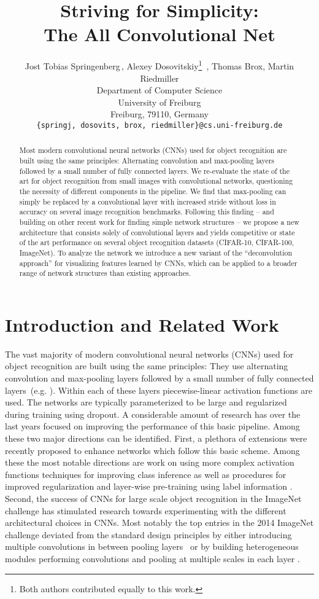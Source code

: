 \documentclass{article} \usepackage{iclr2015,times}
\title{Striving for Simplicity: \\ The All Convolutional Net}
\author{
Jost Tobias Springenberg\footnotemark[1] \,, Alexey
Dosovitskiy\thanks{Both authors contributed equally to this work.}\, , Thomas Brox, Martin Riedmiller \\
Department of Computer Science\\
University of Freiburg\\
Freiburg, 79110, Germany \\
\texttt{\{springj, dosovits, brox, riedmiller\}@cs.uni-freiburg.de} \\
}
\begin{document}
\maketitle

\begin{abstract}
Most modern convolutional neural networks (CNNs) used for
object recognition are built using the same principles: Alternating convolution and max-pooling
layers followed by a small number of fully connected layers.
We re-evaluate the state of the art for object recognition from small
images with convolutional networks, questioning the necessity of
different components in the pipeline. We find that
max-pooling can simply be replaced by a convolutional layer with increased stride
without loss in accuracy on several image recognition
benchmarks. Following this finding -- and building on other recent work
for finding simple network structures -- we propose a new
architecture that consists solely of convolutional layers and yields
competitive or state of the art performance on several object recognition datasets (CIFAR-10, CIFAR-100, ImageNet). 
To analyze the network we introduce a new variant of the ``deconvolution approach'' for visualizing features learned by CNNs, which can be applied to a broader range of network structures than existing approaches. 
\end{abstract}

\section{Introduction and Related Work}
The vast majority of modern convolutional neural networks (CNNs) used
for object recognition are built using the same principles: They 
use alternating convolution and max-pooling layers followed by a small number of fully
connected layers~(e.g. \citet{Jarrett_2009,Krizhevsky_NIPS2012,Ciresan_2011}). Within each of these layers piecewise-linear
activation functions are used. The networks are
typically parameterized to be large and regularized during training
using dropout. A considerable amount of research has over the last years 
focused on improving the performance of this basic pipeline. Among
these two major directions can be identified.
First, a plethora of extensions were recently proposed to
enhance networks which follow this basic scheme. Among these the most
notable directions are work on using more complex activation functions
\citep{Goodfellow2013,Lin_2014,SrivastavaSchmid_2013} techniques for improving class inference
\citep{Stollenga_2014,Nitish2013} as well as procedures for improved regularization
\citep{ZeilerStochastic2013,SprRied2014a,WanLi2013} and layer-wise pre-training using label information
\citep{Lee_2014}.
Second, the success of CNNs for large scale object recognition in the
ImageNet challenge \citep{Krizhevsky_NIPS2012} has stimulated research
towards experimenting with the different architectural choices in
CNNs. Most notably the top entries in the 2014 ImageNet challenge
deviated from the standard design principles by either introducing
multiple convolutions in between pooling layers~\citep{VGG_2014} or by
building heterogeneous modules performing convolutions and pooling at multiple
scales in each layer \citep{GoingDeep_2014}.
\end{document}

